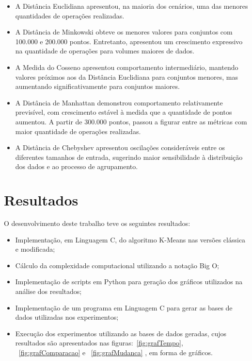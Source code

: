 \documentclass[10pt,a4paper,twocolumn]{article}
\begin{document}
\begin{itemize}

\item A Distância Euclidiana apresentou, na maioria dos cenários, uma das menores quantidades de operações realizadas.

\item A Distância de Minkowski obteve os menores valores para conjuntos com 100.000 e 200.000 pontos. Entretanto, apresentou um crescimento expressivo na quantidade de operações para volumes maiores de dados.

\item A Medida do Cosseno apresentou comportamento intermediário, mantendo valores próximos aos da Distância Euclidiana para conjuntos menores, mas aumentando significativamente para conjuntos maiores.

\item A Distância de Manhattan demonstrou comportamento relativamente previsível, com crescimento estável à medida que a quantidade de pontos aumentou. A partir de 300.000 pontos, passou a figurar entre as métricas com maior quantidade de operações realizadas.

\item A Distância de Chebyshev apresentou oscilações consideráveis entre os diferentes tamanhos de entrada, sugerindo maior sensibilidade à distribuição dos dados e ao processo de agrupamento.

\end{itemize}

\section{Resultados}

O desenvolvimento deste trabalho teve os seguintes resultados:

\begin{itemize}
    \item Implementação, em Linguagem C, do algoritmo K-Means nas versões clássica e modificada;
    
    \item Cálculo da complexidade computacional utilizando a notação Big O;
    
    \item Implementação de scripts em Python para geração dos gráficos utilizados na análise dos resultados;
    
    \item Implementação de um programa em Linguagem C para gerar as bases de dados utilizadas nos experimentos;
    
    \item Execução dos experimentos utilizando as bases de dados geradas, cujos resultados são apresentados nas figuras:~\ref{fig:grafTempo}, ~\ref{fig:grafComparacao} e ~\ref{fig:grafMudanca} , em forma de gráficos.
\end{itemize}
\end{document}

